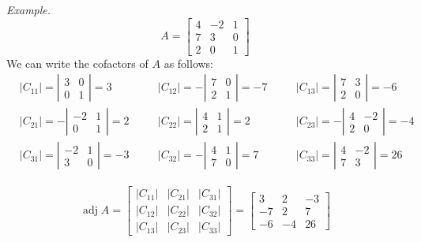 \documentclass{./../Latex/handout}
\begin{document}
\textit{Example.} 
$$
A=\left[\begin{array}{ccc}
4 & -2 & 1 \\
7 & 3 & 0 \\
2 & 0 & 1
\end{array}\right]
$$ 
We can write the cofactors of $A$ as follows: 
\begin{align*}
&\left|C_{11}\right|=\left|\begin{array}{cc}
3 & 0 \\
0 & 1
\end{array}\right|=3 \quad
&&\left|C_{12}\right|=-\left|\begin{array}{cc}
7 & 0 \\
2 & 1
\end{array}\right|=-7 \quad
&&\left|C_{13}\right|=\left|\begin{array}{cc}
7 & 3 \\
2 & 0
\end{array}\right|=-6 \\
&\left|C_{21}\right|=-\left|\begin{array}{cc}
-2 & 1 \\
0 & 1
\end{array}\right|=2 \quad
&& \left|C_{22}\right|=\left|\begin{array}{ll}
4 & 1 \\
2 & 1
\end{array}\right|=2 \quad
&&\left|C_{23}\right|=-\left|\begin{array}{cc}
4 & -2 \\
2 & 0
\end{array}\right|=-4 \\
&\left|C_{31}\right|=\left|\begin{array}{cc}
-2 & 1 \\
3 & 0
\end{array}\right|=-3 \quad
&&\left|C_{32}\right|=-\left|\begin{array}{ll}
4 & 1 \\
7 & 0
\end{array}\right|=7 \quad
&&\left|C_{33}\right|=\left|\begin{array}{cc}
4 & -2 \\
7 & 3
\end{array}\right|=26
\end{align*}

$$
\begin{aligned}
\operatorname{adj} A =\left[\begin{array}{ccc}
\left|C_{11}\right| & \left|C_{21}\right| & \left|C_{31}\right| \\
\left|C_{12}\right| & \left|C_{22}\right| & \left|C_{32}\right| \\
\left|C_{13}\right| & \left|C_{23}\right| & \left|C_{33}\right|
\end{array}\right] 
=\left[\begin{array}{ccc}
3 & 2 & -3 \\
-7 & 2 & 7 \\
-6 & -4 & 26
\end{array}\right]
\end{aligned}
$$
\end{document}
